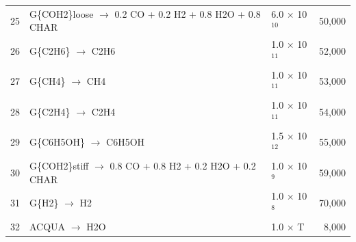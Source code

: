 \begin{center}
\begin{longtable}{cp{4in}lr}
        25 & G\{COH2\}loose $\rightarrow$ 0.2 CO + 0.2 H2 + 0.8 H2O + 0.8 CHAR & 6.0 $\times$ 10$^{10}$ & 50,000 \\
        26 & G\{C2H6\} $\rightarrow$ C2H6 & 1.0 $\times$ 10$^{11}$ & 52,000 \\
        27 & G\{CH4\} $\rightarrow$ CH4 & 1.0 $\times$ 10$^{11}$ & 53,000 \\
        28 & G\{C2H4\} $\rightarrow$ C2H4 & 1.0 $\times$ 10$^{11}$ & 54,000 \\
        29 & G\{C6H5OH\} $\rightarrow$ C6H5OH & 1.5 $\times$ 10$^{12}$ & 55,000 \\
        30 & G\{COH2\}stiff $\rightarrow$ 0.8 CO + 0.8 H2 + 0.2 H2O + 0.2 CHAR & 1.0 $\times$ 10$^9$ & 59,000 \\
        31 & G\{H2\} $\rightarrow$ H2 & 1.0 $\times$ 10$^8$ & 70,000 \\
        32 & ACQUA $\rightarrow$ H2O & 1.0 $\times$ T & 8,000 \\
        \bottomrule
    \end{longtable}
\end{center}

